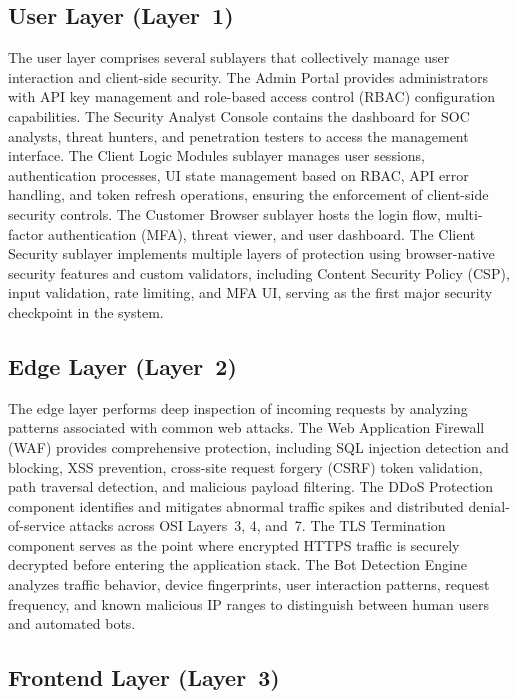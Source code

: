 \documentclass[12pt, a4paper]{article}
\begin{document}
\subsection{User Layer (Layer~1)}

The user layer comprises several sublayers that collectively manage user interaction and client-side security. The Admin Portal provides administrators with API key management and role-based access control (RBAC) configuration capabilities. The Security Analyst Console contains the dashboard for SOC analysts, threat hunters, and penetration testers to access the management interface. The Client Logic Modules sublayer manages user sessions, authentication processes, UI state management based on RBAC, API error handling, and token refresh operations, ensuring the enforcement of client-side security controls. The Customer Browser sublayer hosts the login flow, multi-factor authentication (MFA), threat viewer, and user dashboard. The Client Security sublayer implements multiple layers of protection using browser-native security features and custom validators, including Content Security Policy (CSP), input validation, rate limiting, and MFA UI, serving as the first major security checkpoint in the system.

\subsection{Edge Layer (Layer~2)}

The edge layer performs deep inspection of incoming requests by analyzing patterns associated with common web attacks. The Web Application Firewall (WAF) provides comprehensive protection, including SQL injection detection and blocking, XSS prevention, cross-site request forgery (CSRF) token validation, path traversal detection, and malicious payload filtering. The DDoS Protection component identifies and mitigates abnormal traffic spikes and distributed denial-of-service attacks across OSI Layers~3, 4, and~7. The TLS Termination component serves as the point where encrypted HTTPS traffic is securely decrypted before entering the application stack. The Bot Detection Engine analyzes traffic behavior, device fingerprints, user interaction patterns, request frequency, and known malicious IP ranges to distinguish between human users and automated bots.

\subsection{Frontend Layer (Layer~3)}
\end{document}
